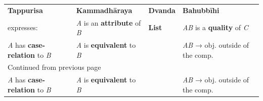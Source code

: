 \documentclass[11pt,oneside]{memoir}
\begin{document}
\hspace{-20pt}%
\begin{minipage}{\linewidth+10pt}%

\begin{longtable}{llll}
\textbf{Tappurisa} & \textbf{Kammadhāraya} & \textbf{Dvanda} & \textbf{Bahubbīhi}\\[0pt]
expresses: & \emph{A} is an \textbf{attribute} of \emph{B} & \textbf{List} & \emph{AB} is a \textbf{quality} of \emph{C}\\[0pt]
\emph{A} has \textbf{case-relation} to \emph{B} & \emph{A} is \textbf{equivalent} to \emph{B} &  & \emph{AB} → obj. outside of the comp.\\[0pt]
\hline
\endfirsthead
\multicolumn{4}{l}{Continued from previous page} \\[0pt]

\emph{A} has \textbf{case-relation} to \emph{B} & \emph{A} is \textbf{equivalent} to \emph{B} &  & \emph{AB} → obj. outside of the comp. \\[0pt]


\end{longtable}
\end{minipage}
\end{document}
